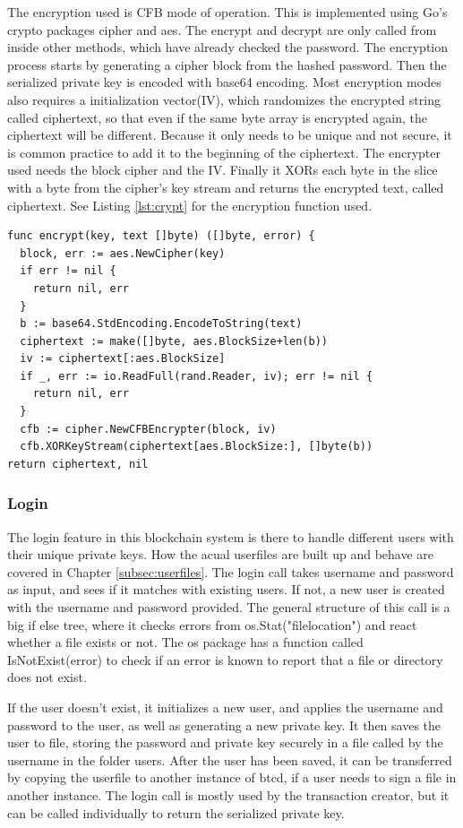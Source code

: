 \documentclass[12pt]{article}
\begin{document}
The encryption used is CFB mode of operation. This is implemented using Go's crypto packages cipher and aes. The encrypt and decrypt are only called from inside other methods, which have already checked the password. The encryption process starts by generating a cipher block from the hashed password. Then the serialized private key is encoded with base64 encoding. Most encryption modes also requires a initialization vector(IV), which randomizes the encrypted string called ciphertext, so that even if the same byte array is encrypted again, the ciphertext will be different. Because it only needs to be unique and not secure, it is common practice to add it to the beginning of the ciphertext. The encrypter used needs the block cipher and the IV. Finally it XORs each byte in the slice with a byte from the cipher's key stream and returns the encrypted text, called ciphertext. See Listing \ref{lst:crypt} for the encryption function used.

\begin{lstlisting}[float=h!,caption={Encryption},label=lst:crypt]
func encrypt(key, text []byte) ([]byte, error) {
  block, err := aes.NewCipher(key)
  if err != nil {
    return nil, err
  }
  b := base64.StdEncoding.EncodeToString(text)
  ciphertext := make([]byte, aes.BlockSize+len(b))
  iv := ciphertext[:aes.BlockSize]
  if _, err := io.ReadFull(rand.Reader, iv); err != nil {
    return nil, err
  }
  cfb := cipher.NewCFBEncrypter(block, iv)
  cfb.XORKeyStream(ciphertext[aes.BlockSize:], []byte(b))
return ciphertext, nil
\end{lstlisting}

\subsubsection{Login}

The login feature in this blockchain system is there to handle different users with their unique private keys. How the acual userfiles are built up and behave are covered in Chapter \ref{subsec:userfiles}. The login call takes username and password as input, and sees if it matches with existing users. If not, a new user is created with the username and password provided. The general structure of this call is a big if else tree, where it checks errors from os.Stat("filelocation") and react whether a file exists or not. The os package has a function called IsNotExist(error) to check if an error is known to report that a file or directory does not exist. 

If the user doesn't exist, it initializes a new user, and applies the username and password to the user, as well as generating a new private key. It then saves the user to file, storing the password and private key securely in a file called by the username in the folder users. After the user has been saved, it can be transferred by copying the userfile to another instance of btcd, if a user needs to sign a file in another instance. The login call is mostly used by the transaction creator, but it can be called individually to return the serialized private key. 
\end{document}
